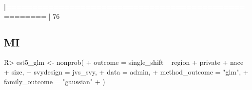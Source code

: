 \documentclass[
]{jss}
\begin{document}
\begin{CodeChunk}
\begin{CodeOutput}
                   |=====================================================                 |  76%
\end{CodeOutput}
\end{CodeChunk}

\hypertarget{mi}{%
\subsection{MI}\label{mi}}

\begin{CodeChunk}
\begin{CodeInput}
R> est5_glm <- nonprob(
+   outcome = single_shift ~ region + private + nace + size,
+   svydesign = jvs_svy,
+   data = admin,
+   method_outcome = "glm",
+   family_outcome = "gaussian"
+ )
\end{CodeInput}
\end{CodeChunk}
\end{document}
